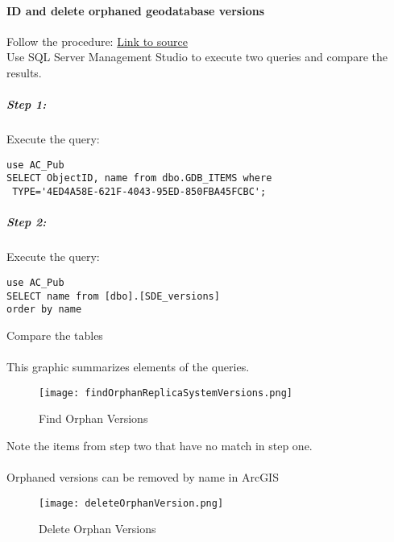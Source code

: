 \documentclass[class=article , crop=false, titlepage, twoside, multi={itemize, figure, verbatim}, float=false]{standalone}
\begin{document}
\paragraph{ID and delete orphaned geodatabase versions \texorpdfstring{\\}{}}
Follow the procedure:
\href{https://support.esri.com/en/technical-article/000010858}{Link to source}\\
Use SQL Server Management Studio to execute two queries and compare the results.
\subparagraph*{Step 1: \texorpdfstring{\\}{}}
Execute the query:
\begin{verbatim}
use AC_Pub
SELECT ObjectID, name from dbo.GDB_ITEMS where 
 TYPE='4ED4A58E-621F-4043-95ED-850FBA45FCBC';
\end{verbatim}
\subparagraph*{Step 2: \texorpdfstring{\\}{}}
Execute the query:
\begin{verbatim}
use AC_Pub
SELECT name from [dbo].[SDE_versions]
order by name

\end{verbatim}
Compare the tables
\paragraph*{}This graphic summarizes elements of the queries.
\begin{figure}[h!]
\centering
    \texttt{[image: findOrphanReplicaSystemVersions.png]}
\caption{Find Orphan Versions}
\end{figure}
Note the items from step two that have no match in step one.
\clearpage

\paragraph*{}Orphaned versions can be removed by name in ArcGIS
\begin{figure}[h!]
\centering
    \texttt{[image: deleteOrphanVersion.png]}
\caption{Delete Orphan Versions}
\end{figure}
\clearpage
\end{document}
